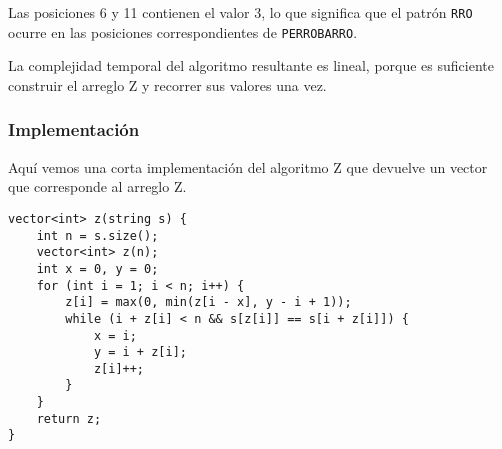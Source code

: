 Las posiciones 6 y 11 contienen el valor 3, lo que significa que el
patrón \texttt{RRO} ocurre en las posiciones correspondientes de
\texttt{PERROBARRO}.

La complejidad temporal del algoritmo resultante es lineal, porque es
suficiente construir el arreglo Z y recorrer sus valores una vez.

\subsubsection{Implementación}

Aquí vemos una corta implementación del algoritmo Z que devuelve un
vector que corresponde al arreglo Z.

\begin{lstlisting}
vector<int> z(string s) {
    int n = s.size();
    vector<int> z(n);
    int x = 0, y = 0;
    for (int i = 1; i < n; i++) {
        z[i] = max(0, min(z[i - x], y - i + 1));
        while (i + z[i] < n && s[z[i]] == s[i + z[i]]) {
            x = i;
            y = i + z[i];
            z[i]++;
        }
    }
    return z;
}
\end{lstlisting}